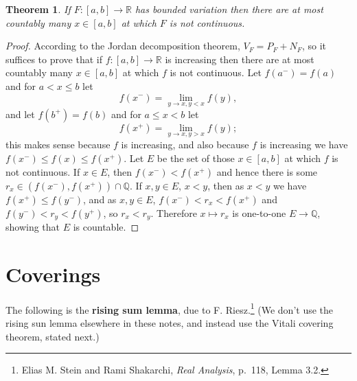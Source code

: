 \documentclass{article}
\newtheorem{theorem}{Theorem}
\theoremstyle{definition}
\begin{document}
\begin{theorem}
If $F:[a,b] \to \mathbb{R}$ has bounded variation then there are at most  countably
many $x \in [a,b]$ at which $F$ is not continuous.
\end{theorem}
\begin{proof}
According to the Jordan decomposition theorem, $V_F = P_F+N_F$, so it suffices to prove that
if $f:[a,b] \to \mathbb{R}$ is increasing then there are at most countably many $x \in [a,b]$ at which
$f$ is not continuous. 
Let $f(a^-)=f(a)$ and for $a<x \leq b$ let
\[
f(x^-) = \lim_{y \to x, y<x}f(y),
\]
and let $f(b^+)=f(b)$ and for $a \leq x < b$ let
\[
f(x^+) = \lim_{y \to x, y>x} f(y);
\]
this makes sense because $f$ is increasing, and also because $f$ is increasing we have
$f(x^-) \leq f(x) \leq f(x^+)$. 
Let $E$ be the set of those $x \in [a,b]$ at which $f$ is not continuous. 
If $x \in E$,  then $f(x^-)<f(x^+)$ and hence
there is some $r_x \in (f(x^-),f(x^+)) \cap \mathbb{Q}$. If $x,y \in E$, $x<y$, then 
as $x<y$ we have $f(x^+) \leq f(y^-)$, and as $x,y \in E$, $f(x^-)<r_x<f(x^+)$ and
$f(y^-)<r_y<f(y^+)$, so  $r_x<r_y$. Therefore $x \mapsto r_x$ is one-to-one $E \to \mathbb{Q}$, showing
that $E$ is countable.
\end{proof}




\section{Coverings}
The following is the \textbf{rising sum lemma}, due to F. Riesz.\footnote{Elias M. Stein and Rami Shakarchi,
{\em Real Analysis}, p.~118, Lemma 3.2.} (We don't use the rising sun lemma elsewhere in these notes, and instead use the
Vitali covering theorem, stated next.)
\end{document}

